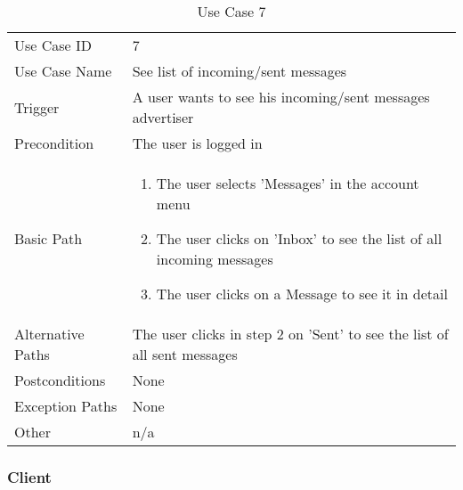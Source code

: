 \begin{table}[H]
\centering
\label{table-use-case-7}
\begin{tabular}{|p{3cm}|p{10cm}}
Use Case ID       & 7                                                           
\\
Use Case Name     & See list of incoming/sent messages                                                         
\\
Trigger           & A user wants to see his incoming/sent messages
advertiser
\\
Precondition      & The user is logged in                                                
\\
Basic Path        & \begin{enumerate}
\item The user selects 'Messages' in the account menu
\item The user clicks on 'Inbox' to see the list of all incoming messages
\item The user clicks on a Message to see it in detail
\end{enumerate} 
     \\
Alternative Paths & The user clicks in step 2 on 'Sent' to see the list of all
sent messages
\\
Postconditions    & None
\\
Exception Paths   & None
\\
Other             & n/a                                                                                                                                                                                                        
\end{tabular}
\caption{Use Case 7}
\end{table}


\subsubsection{Client}


